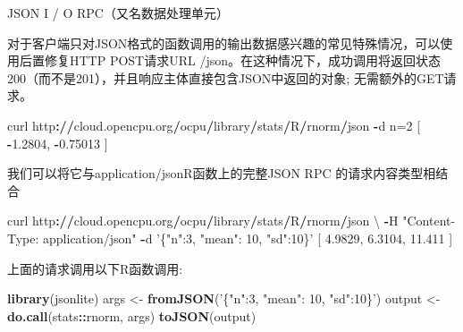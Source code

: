 \documentclass[]{book}
\newenvironment{Shaded}{\begin{snugshade}}{\end{snugshade}}
\newcommand{\KeywordTok}[1]{\textcolor[rgb]{0.13,0.29,0.53}{\textbf{#1}}}
\newcommand{\DecValTok}[1]{\textcolor[rgb]{0.00,0.00,0.81}{#1}}
\newcommand{\FloatTok}[1]{\textcolor[rgb]{0.00,0.00,0.81}{#1}}
\newcommand{\StringTok}[1]{\textcolor[rgb]{0.31,0.60,0.02}{#1}}
\newcommand{\OperatorTok}[1]{\textcolor[rgb]{0.81,0.36,0.00}{\textbf{#1}}}
\newcommand{\ErrorTok}[1]{\textcolor[rgb]{0.64,0.00,0.00}{\textbf{#1}}}
\newcommand{\NormalTok}[1]{#1}
\begin{document}
JSON I / O RPC（又名数据处理单元）

对于客户端只对JSON格式的函数调用的输出数据感兴趣的常见特殊情况，可以使用后置修复HTTP
POST请求URL
/json。在这种情况下，成功调用将返回状态200（而不是201），并且响应主体直接包含JSON中返回的对象;
无需额外的GET请求。

\begin{Shaded}
\begin{Highlighting}[]
\NormalTok{curl http}\OperatorTok{:}\ErrorTok{//}\NormalTok{cloud.opencpu.org}\OperatorTok{/}\NormalTok{ocpu}\OperatorTok{/}\NormalTok{library}\OperatorTok{/}\NormalTok{stats}\OperatorTok{/}\NormalTok{R}\OperatorTok{/}\NormalTok{rnorm}\OperatorTok{/}\NormalTok{json }\OperatorTok{-}\NormalTok{d n=}\DecValTok{2}
\NormalTok{[}
\OperatorTok{-}\FloatTok{1.2804}\NormalTok{,}
\OperatorTok{-}\FloatTok{0.75013}
\NormalTok{]}
\end{Highlighting}
\end{Shaded}

我们可以将它与application/jsonR函数上的完整JSON RPC 的请求内容类型相结合

\begin{Shaded}
\begin{Highlighting}[]
\NormalTok{curl http}\OperatorTok{:}\ErrorTok{//}\NormalTok{cloud.opencpu.org}\OperatorTok{/}\NormalTok{ocpu}\OperatorTok{/}\NormalTok{library}\OperatorTok{/}\NormalTok{stats}\OperatorTok{/}\NormalTok{R}\OperatorTok{/}\NormalTok{rnorm}\OperatorTok{/}\NormalTok{json \textbackslash{}}
\OperatorTok{-}\NormalTok{H }\StringTok{"Content-Type: application/json"} \OperatorTok{-}\NormalTok{d }\StringTok{'\{"n":3, "mean": 10, "sd":10\}'}
\NormalTok{[}
\FloatTok{4.9829}\NormalTok{,}
\FloatTok{6.3104}\NormalTok{,}
\FloatTok{11.411}
\NormalTok{]}
\end{Highlighting}
\end{Shaded}

上面的请求调用以下R函数调用:

\begin{Shaded}
\begin{Highlighting}[]
\KeywordTok{library}\NormalTok{(jsonlite)}
\NormalTok{args <-}\StringTok{ }\KeywordTok{fromJSON}\NormalTok{(}\StringTok{'\{"n":3, "mean": 10, "sd":10\}'}\NormalTok{)}
\NormalTok{output <-}\StringTok{ }\KeywordTok{do.call}\NormalTok{(stats}\OperatorTok{::}\NormalTok{rnorm, args)}
\KeywordTok{toJSON}\NormalTok{(output)}
\end{Highlighting}
\end{Shaded}
\end{document}
